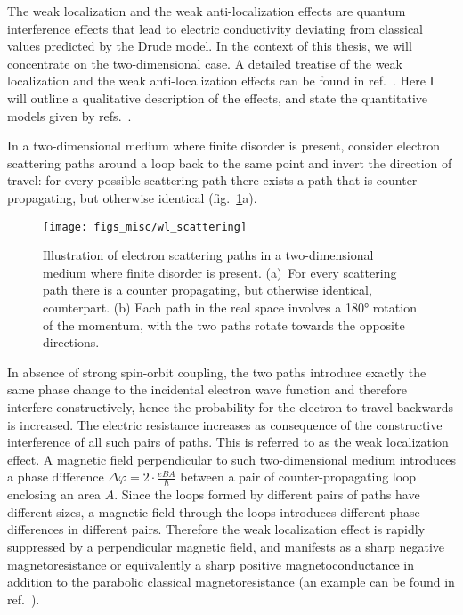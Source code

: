 The weak localization and the weak anti-localization effects are quantum interference effects that lead to electric conductivity deviating from classical values predicted by the Drude model. In the context of this thesis, we will concentrate on the two-dimensional case. A detailed treatise of the weak localization and the weak anti-localization effects can be found in ref.~\cite{bergmann1984}. Here I will outline a qualitative description of the effects, and state the quantitative models given by refs.~\cite{bergmann1984, anderson1979, WL_HLN, WAL_theory, WL_Khmel}.

In a two-dimensional medium where finite disorder is present, consider electron scattering paths around a loop back to the same point and invert the direction of travel: for every possible scattering path there exists a path that is counter-propagating, but otherwise identical (fig.~\ref{fig:bg_scattering}a).%
\begin{figure}[ht]%
    \centering%
    \texttt{[image: figs\_misc/wl\_scattering]}%
    \caption[Schematic illustrations of electron scattering paths in two-dimensions.]{\label{fig:bg_scattering}Illustration of electron scattering paths in a two-dimensional medium where finite disorder is present. (a)~For every scattering path there is a counter propagating, but otherwise identical, counterpart. (b) Each path in the real space involves a \ang{180} rotation of the momentum, with the two paths rotate towards the opposite directions.}%
\end{figure}%

In absence of strong spin-orbit coupling, the two paths introduce exactly the same phase change to the incidental electron wave function and therefore interfere constructively, hence the probability for the electron to travel backwards is increased. The electric resistance increases as consequence of the constructive interference of all such pairs of paths. This is referred to as the weak localization effect. A magnetic field perpendicular to such two-dimensional medium introduces a phase difference $\Delta\varphi = 2\cdot\frac{eBA}{\hbar}$ between a pair of counter-propagating loop enclosing an area $A$. Since the loops formed by different pairs of paths have different sizes, a magnetic field through the loops introduces different phase differences in different pairs. Therefore the weak localization effect is rapidly suppressed by a perpendicular magnetic field, and manifests as a sharp negative magnetoresistance or equivalently a sharp positive magnetoconductance in addition to the parabolic classical magnetoresistance (an example can be found in ref.~\cite{bishop1982}).

